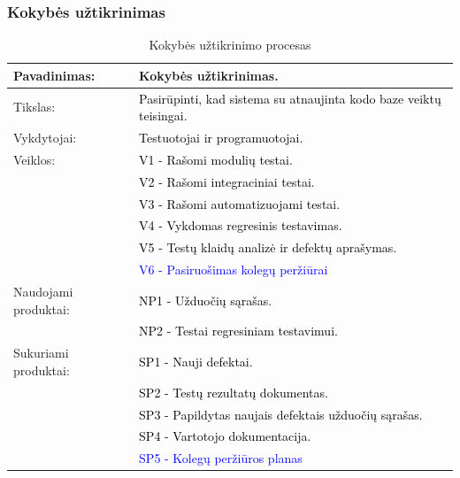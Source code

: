 \documentclass{VUMIFPSkursinis}
\begin{document}
	\subsubsection{Kokybės užtikrinimas}
	\begin{center}
		\begin{table}[ht]
			\caption{Kokybės užtikrinimo procesas}
			\begin{tabular}{ | l | l | }
				\hline
				Pavadinimas:          & Kokybės užtikrinimas.                                \\ \hline
				Tikslas:              & \textcolor{black}{Pasirūpinti, kad sistema su atnaujinta kodo baze veiktų teisingai.} \\ \hline
				Vykdytojai:	          & \textcolor{black}{Testuotojai ir programuotojai.}                       \\ \hline
				Veiklos:              & \textcolor{black}{V1 - Rašomi modulių testai.}                          \\
				                      & \textcolor{black}{V2 - Rašomi integraciniai testai.}                    \\
				                      & \textcolor{black}{V3 - Rašomi automatizuojami testai.}                  \\
				                      & \textcolor{black}{V4 - Vykdomas regresinis testavimas.}                 \\
				                      & \textcolor{black}{V5 - Testų klaidų analizė ir defektų aprašymas.}      \\ 
						      & \textcolor{blue}{V6 - Pasiruošimas kolegų peržiūrai}\\	 \hline
				Naudojami produktai:  & \textcolor{black}{NP1 - Užduočių sąrašas.}                              \\
				                      & \textcolor{black}{NP2 - Testai regresiniam testavimui.}                 \\ \hline
				Sukuriami produktai:  & \textcolor{black}{SP1 - Nauji defektai.}                                \\
				                      & \textcolor{black}{SP2 - Testų rezultatų dokumentas.}                    \\
				                      & \textcolor{black}{SP3 - Papildytas naujais defektais užduočių sąrašas.} \\
				                      & \textcolor{black}{SP4 - Vartotojo dokumentacija.}                       \\ 
						      & \textcolor{blue}{SP5 - Kolegų peržiūros planas}\\ \hline
			\end{tabular}
		\end{table}
	\end{center}
\end{document}
